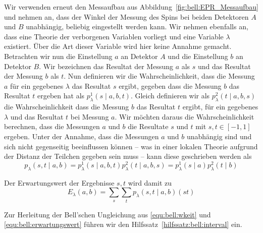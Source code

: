 \begin{refsection}
Wir verwenden erneut den Messaufbau aus Abbildung~\ref{fig:bell:EPR_Messaufbau}
und nehmen an, dass der Winkel der Messung des Spins bei beiden Detektoren 
$A$ und $B$ unabh\"angig, beliebig eingestellt werden kann.
Wir nehmen ebenfalls an, dass eine Theorie der verborgenen Variablen vorliegt
und eine Variable $\lambda$ existiert.
\"Uber die Art dieser Variable wird hier keine Annahme gemacht.
Betrachten wir nun die Einstellung $a$ an Detektor $A$ und die Einstellung
$b$ an Detektor $B$.
Wir bezeichnen das Resultat der Messung $a$ als $s$ und das Resultat
der Messung $b$ als $t$.
Nun definieren wir die Wahrscheinlichkeit, dass die Messung $a$ f\"ur ein
gegebenes $\lambda$ das Resultat $s$ ergibt, gegeben dass die Messung $b$ das
Resultat $t$ ergeben hat als $p_{\lambda}^1(s \mid a,b,t)$.
Gleich definieren wir als $p_{\lambda}^2(t \mid a,b,s)$ die Wahrscheinlichkeit
dass die Messung $b$ das Resultat $t$ ergibt, f\"ur ein gegebenes $\lambda$ und
das Resultat $t$ bei Messung $a$. 
Wir m\"ochten daraus die Wahrscheinlichkeit berechnen, dass die Messungen
$a$ und $b$ die Resultate $s$ und $t$ mit $s,t \in [-1,1]$ ergeben. 
Unter der Annahme, dass die Messungen $a$ und $b$ unabh\"angig sind und sich
nicht gegenseitig beeinflussen k\"onnen -- was in einer lokalen Theorie
aufgrund der Distanz der Teilchen gegeben sein muss -- kann diese geschrieben
werden als
\begin{equation}
    p_{\lambda}(s,t \mid a,b) 
    = p_{\lambda}^1(s \mid a,b,t) p_{\lambda}^2(t \mid a,b,s)
    = p_{\lambda}^1(s \mid a) p_{\lambda}^2(t \mid b)
    \label{equ:bell:wkeit}
\end{equation}

Der Erwartungswert der Ergebnisse $s,t$ wird damit zu
\begin{equation}
    E_{\lambda}(a,b) = \sum_s \sum_t p_{\lambda}(s,t \mid a,b) (st)
    \label{equ:bell:erwartungswert}
\end{equation}

Zur Herleitung der Bell'schen Ungleichung aus \eqref{equ:bell:wkeit} und
\eqref{equ:bell:erwartungswert} f\"uhren wir den
Hilfssatz~\ref{hilfssatz:bell:interval} ein.


\end{refsection}
